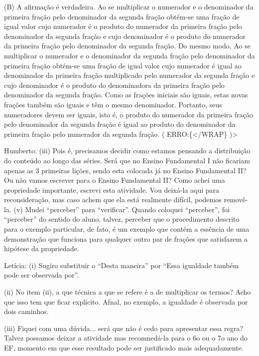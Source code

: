 \documentclass[a4,12pt]{book}
\newcounter{atividade}
\begin{document}
(B) A afirmação é verdadeira. Ao se multiplicar o numerador e o denominador da primeira fração pelo denominador da segunda fração obtém-se uma fração de igual valor cujo numerador é o produto do numerador da primeira fração pelo denominador da segunda fração e cujo denominador é o produto do numerador da primeira fração pelo denominador da segunda fração. Do mesmo modo, 
Ao se multiplicar o numerador e o denominador da segunda fração pelo denominador da primeira fração obtém-se uma fração de igual valor cujo numerador é igual ao denominador da primeira fração multiplicado pelo numerador da segunda fração e cujo denominador é o produto do denominadora da primeira fração pelo denominador da segunda fração. Como as frações iniciais são iguais, estas novas frações também são iguais e têm o mesmo denominador. Portanto, seus numeradores devem ser iguais, isto é, o produto do numerador da primeira fração pelo denominador da segunda fração é igual ao produto do denominador da primeira fração pelo numerador da segunda fração.
( ERRO:\{</WRAP\} )>



Humberto:
(iii) Pois é, precisamos decidir como estamos pensando a distribuição do conteúdo ao longo das séries. Será que no Ensino Fundamental I não ficariam apenas as 3 primeiras lições, sendo esta colocada já no Ensino Fundamental II? Ou não vamos escrever para o Ensino Fundamental II? Como achei uma propriedade importante, escrevi esta atividade. Vou deixá-la aqui para reconsideração, mas caso achem que ela está realmente difícil, podemos removê-la. 
(v) Mudei ``perceber'' para ``verificar''. Quando coloquei ``perceber'', foi ``perceber'' do sentido do aluno, talvez, perceber que o procedimento descrito para o exemplo particular, de fato, é um exemplo que contém a essência de uma demonstração que funciona para qualquer outro par de frações que satisfazem a hipótese da propriedade.

Letícia:
(i) Sugiro substituir o ``Desta maneira'' por ``Essa igualdade também pode ser observada por''.

(ii) No item (ii), a que técnica a que se refere é a de multiplicar os termos? Acho que isso tem que ficar explícito. Afnal, no exemplo, a igualdade é observada por dois caminhos.

(iii) Fiquei com uma dúvida... será que não é cedo para apresentar essa regra? Talvez possamos deixar a atividade mas recomnedá-la para o 6o ou o 7o ano do EF, momento em que esse resultado pode ser justificado mais adequadamente.
\end{document}
